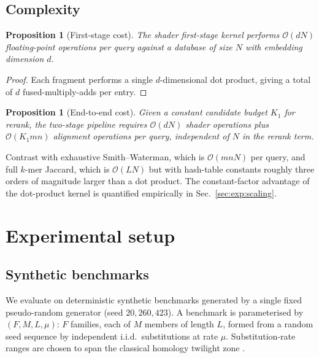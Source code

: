 \documentclass[twocolumn,11pt,a4paper]{article}
\newtheorem{proposition}[theorem]{Proposition}
\theoremstyle{definition}
\theoremstyle{remark}
\newcommand{\bigO}{\mathcal{O}}
\begin{document}
\subsection{Complexity}
\label{sec:method:complex}

\begin{proposition}[First-stage cost]
\label{prop:firststage}
The shader first-stage kernel performs $\bigO(d N)$ floating-point operations
per query against a database of size $N$ with embedding dimension $d$.
\end{proposition}

\begin{proof}
Each fragment performs a single $d$-dimensional dot product, giving a total
of $d$ fused-multiply-adds per entry.
\end{proof}

\begin{proposition}[End-to-end cost]
\label{prop:endtoend}
Given a constant candidate budget $K_1$ for rerank, the two-stage pipeline
requires $\bigO(d N)$ shader operations plus $\bigO(K_1 m n)$ alignment
operations per query, independent of $N$ in the rerank term.
\end{proposition}

Contrast with exhaustive Smith--Waterman, which is $\bigO(m n N)$ per
query, and full $k$-mer Jaccard, which is $\bigO(L N)$ but with hash-table
constants roughly three orders of magnitude larger than a dot product. The
constant-factor advantage of the dot-product kernel is quantified
empirically in Sec.~\ref{sec:exp:scaling}.

\section{Experimental setup}
\label{sec:exp:setup}

\subsection{Synthetic benchmarks}

We evaluate on deterministic synthetic benchmarks generated by a single
fixed pseudo-random generator (seed $20{,}260{,}423$). A benchmark is
parameterised by $(F, M, L, \mu)$: $F$ families, each of $M$ members of
length $L$, formed from a random seed sequence by independent i.i.d.\
substitutions at rate $\mu$. Substitution-rate ranges are chosen to span
the classical homology twilight zone
\citep{ungar2005twilight,dayhoff1978}.
\end{document}
